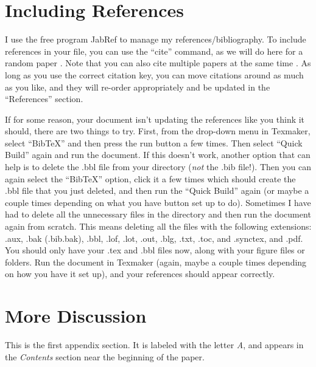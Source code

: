 \documentclass[letterpaper,12pt]{article}
\begin{document}
\section{Including References}
\label{sec:Including_References}

I use the free program JabRef to manage my references/bibliography.  To include references in your file, you can use the ``cite'' command, as we will do here for a random paper \cite{2013_Bathel_CONF}.  Note that you can also cite multiple papers at the same time \cite{2015_Garbeff_CONF,2010_Hargather_CONF}.  As long as you use the correct citation key, you can move citations around as much as you like, and they will re-order appropriately and be updated in the ``References'' section.

If for some reason, your document isn't updating the references like you think it should, there are two things to try.  First, from the drop-down menu in Texmaker, select ``BibTeX'' and then press the run button a few times.  Then select ``Quick Build'' again and run the document.  If this doesn't work, another option that can help is to delete the .bbl file from your directory (\textit{not} the .bib file!).  Then you can again select the ``BibTeX'' option, click it a few times which should create the .bbl file that you just deleted, and then run the ``Quick Build'' again (or maybe a couple times depending on what you have button set up to do).  Sometimes I have had to delete all the unnecessary files in the directory and then run the document again from scratch.  This means deleting all the files with the following extensions: .aux, .bak (.bib.bak), .bbl, .lof, .lot, .out, .blg, .txt, .toc, and .synctex, and .pdf.  You should only have your .tex and .bbl files now, along with your figure files or folders.  Run the document in Texmaker (again, maybe a couple times depending on how you have it set up), and your references should appear correctly.

\newpage
\appendix

\section{More Discussion}

This is the first appendix section.  It is labeled with the letter \textit{A}, and appears in the \textit{Contents} section near the beginning of the paper.
\end{document}
